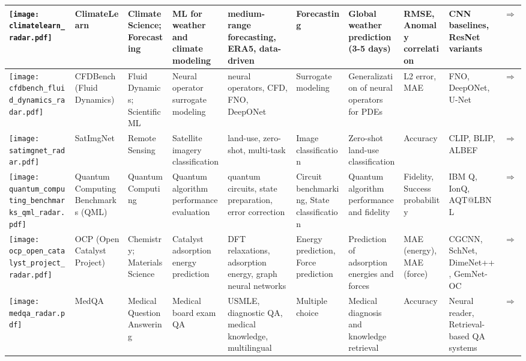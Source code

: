 \begin{landscape}
{\begin{longtable}{|p{}|p{}|p{}|p{}|p{}|p{}|p{}|p{}|p{}|p{}|}
\texttt{[image: climatelearn\_radar.pdf]} & ClimateLearn & Climate Science; Forecasting & ML for weather and climate modeling & medium-range forecasting, ERA5, data-driven & Forecasting & Global weather prediction (3-5 days) & RMSE, Anomaly correlation & CNN baselines, ResNet variants & \cite{nguyen2023climatelearnbenchmarkingmachinelearning}\href{https://arxiv.org/abs/2307.01909}{$\Rightarrow$} \\ \hline
\texttt{[image: cfdbench\_fluid\_dynamics\_radar.pdf]} & CFDBench (Fluid Dynamics) & Fluid Dynamics; Scientific ML & Neural operator surrogate modeling & neural operators, CFD, FNO, DeepONet & Surrogate modeling & Generalization of neural operators for PDEs & L2 error, MAE & FNO, DeepONet, U-Net & \cite{luo2024cfdbenchlargescalebenchmarkmachine}\href{https://arxiv.org/abs/2310.05963}{$\Rightarrow$} \\ \hline
\texttt{[image: satimgnet\_radar.pdf]} & SatImgNet & Remote Sensing & Satellite imagery classification & land-use, zero-shot, multi-task & Image classification & Zero-shot land-use classification & Accuracy & CLIP, BLIP, ALBEF & \cite{roberts2023satin}\href{https://huggingface.co/datasets/saral-ai/satimagnet}{$\Rightarrow$} \\ \hline
\texttt{[image: quantum\_computing\_benchmarks\_qml\_radar.pdf]} & Quantum Computing Benchmarks (QML) & Quantum Computing & Quantum algorithm performance evaluation & quantum circuits, state preparation, error correction & Circuit benchmarking, State classification & Quantum algorithm performance and fidelity & Fidelity, Success probability & IBM Q, IonQ, AQT@LBNL & \cite{kiwit2023}\href{https://github.com/XanaduAI/qml-benchmarks}{$\Rightarrow$} \\ \hline
\texttt{[image: ocp\_open\_catalyst\_project\_radar.pdf]} & OCP (Open Catalyst Project) & Chemistry; Materials Science & Catalyst adsorption energy prediction & DFT relaxations, adsorption energy, graph neural networks & Energy prediction, Force prediction & Prediction of adsorption energies and forces & MAE (energy), MAE (force) & CGCNN, SchNet, DimeNet++, GemNet-OC & \cite{chanussot2021oc20,tran2023oc22,doi:10.1021/acscatal.0c04525,tran2023b}\href{https://opencatalystproject.org/}{$\Rightarrow$} \\ \hline
\texttt{[image: medqa\_radar.pdf]} & MedQA & Medical Question Answering & Medical board exam QA & USMLE, diagnostic QA, medical knowledge, multilingual & Multiple choice & Medical diagnosis and knowledge retrieval & Accuracy & Neural reader, Retrieval-based QA systems & \cite{jin2020diseasedoespatienthave}\href{https://arxiv.org/abs/2009.13081}{$\Rightarrow$} \\ \hline

\end{longtable}}
\end{landscape}
